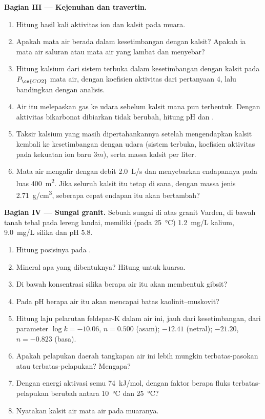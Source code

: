 \begin{problem}
\medskip\noindent\textbf{Bagian III --- Kejenuhan dan travertin.}
\begin{enumerate}[resume]
\item Hitung hasil kali aktivitas ion dan  kalsit
  pada muara.
\item Apakah mata air berada dalam kesetimbangan dengan kalsit? Apakah ia mata air
  saluran atau mata air yang lambat dan menyebar?
\item Hitung kalsium dari sistem terbuka dalam kesetimbangan dengan kalsit pada
  $P_{\ce{CO2}}$ mata air, dengan koefisien aktivitas dari pertanyaan 4,
  lalu bandingkan dengan analisis.
\item Air itu melepaskan gas ke udara sebelum kalsit mana pun terbentuk. Dengan
  aktivitas bikarbonat dibiarkan tidak berubah, hitung pH dan .
\item Taksir kalsium yang masih dipertahankannya setelah mengendapkan kalsit
  kembali ke kesetimbangan dengan udara (sistem terbuka, koefisien aktivitas pada
  kekuatan ion baru $3m$), serta massa kalsit per liter.
\item Mata air mengalir dengan debit \qty{2.0}{L/s} dan menyebarkan endapannya
  pada luas \qty{400}{m^2}. Jika seluruh kalsit itu tetap di sana, dengan massa jenis
  \qty{2.71}{g/cm^3}, seberapa cepat endapan itu akan bertambah?
\end{enumerate}

\medskip\noindent\textbf{Bagian IV --- Sungai granit.} Sebuah sungai di atas
granit Varden, di bawah tanah tebal pada lereng landai, memiliki (pada
\qty{25}{\celsius}) \qty{1.2}{mg/L} kalium, \qty{9.0}{mg/L} silika dan
pH 5.8.
\begin{enumerate}[resume]
\item Hitung posisinya pada .
\item Mineral apa yang dibentuknya? Hitung  untuk kuarsa.
\item Di bawah konsentrasi silika berapa air itu akan membentuk gibsit?
\item Pada pH berapa air itu akan mencapai batas kaolinit--muskovit?
\item Hitung laju pelarutan feldspar-K dalam air ini, jauh dari
  kesetimbangan, dari parameter $\log k = -10.06$, $n = 0.500$ (asam);
  $-12.41$ (netral); $-21.20$, $n = -0.823$ (basa).
\item Apakah pelapukan daerah tangkapan air ini lebih mungkin terbatas-pasokan atau
  terbatas-pelapukan? Mengapa?
\item Dengan energi aktivasi semu \qty{74}{kJ/mol}, dengan faktor berapa
  fluks terbatas-pelapukan berubah antara \qty{10}{\celsius} dan
  \qty{25}{\celsius}?
\item Nyatakan  kalsit air mata air pada
  muaranya.
\end{enumerate}
\end{problem}
